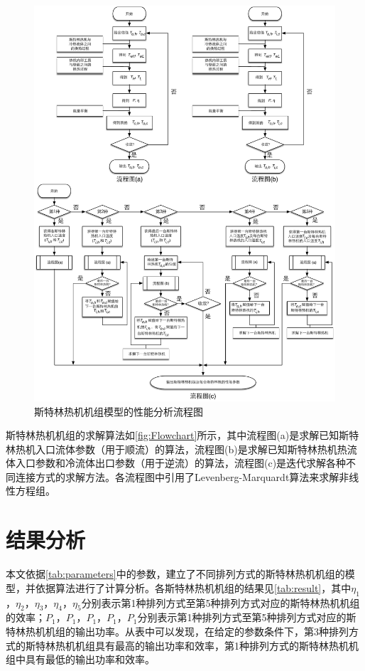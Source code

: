 \begin{figure}[htbp]
\centering
	\includegraphics[width = 1.0\columnwidth]{fig/FlowChart}
	\caption{斯特林热机机组模型的性能分析流程图}
	\label{fig:Flowchart}
\end{figure}

斯特林热机机组的求解算法如\autoref{fig:Flowchart}所示，其中流程图(a)是求解已知斯特林热机入口流体参数（用于顺流）的算法，流程图(b)是求解已知斯特林热机热流体入口参数和冷流体出口参数（用于逆流）的算法，流程图(c)是迭代求解各种不同连接方式的求解方法。各流程图中引用了Levenberg-Marquardt算法来求解非线性方程组。

\section{结果分析}

本文依据\autoref{tab:parameters}中的参数，建立了不同排列方式的斯特林热机机组的模型，并依据算法进行了计算分析。各斯特林热机机组的结果见\autoref{tab:result}，其中$\eta_1$，$\eta_2$，$\eta_3$，$\eta_4$，$\eta_5$分别表示第1种排列方式至第5种排列方式对应的斯特林热机机组的效率；$P_1$，$P_1$，$P_1$，$P_1$，$P_1$分别表示第1种排列方式至第5种排列方式对应的斯特林热机机组的输出功率。从表中可以发现，在给定的参数条件下，第3种排列方式的斯特林热机机组具有最高的输出功率和效率，第1种排列方式的斯特林热机机组中具有最低的输出功率和效率。

